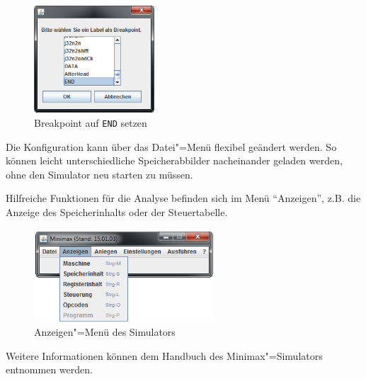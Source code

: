 \begin{figure}[htb]
    \centering
    \includegraphics[width=0.4\textwidth]{dokumentation/res/minimax_breakpoint.png}
    \caption{Breakpoint auf \texttt{END} setzen}
    \label{figure:Dokumentation-Simulation-Breakpoint}
\end{figure}

Die Konfiguration kann über das Datei"=Menü flexibel geändert werden. So können leicht unterschiedliche Speicherabbilder nacheinander geladen werden, ohne den Simulator neu starten zu müssen.

\pagebreak

Hilfreiche Funktionen für die Analyse befinden sich im Menü "`Anzeigen"', z.B. die Anzeige des Speicherinhalts oder der Steuertabelle.

\begin{figure}[htb]
    \centering
    \includegraphics[width=0.6\textwidth]{dokumentation/res/minimax_anzeigen.png}
    \caption{Anzeigen"=Menü des Simulators}
    \label{figure:Dokumentation-Simulation-Anzeigen}
\end{figure}

Weitere Informationen können dem Handbuch des Minimax"=Simulators \cite{minimax-handbuch} entnommen werden.